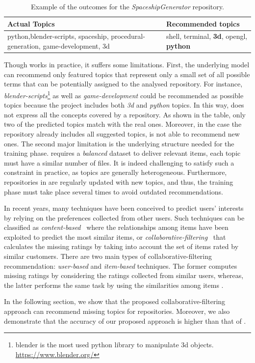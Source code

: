 \begin{table}[h]
\centering
\resizebox{8.5cm}{!} {
\footnotesize
\begin{tabular}{| p{3.2cm} | p{3.2cm} | }
\hline
 \textbf{Actual Topics} &\textbf{ Recommended topics} \\ \hline
     python,blender-scripts, spaceship, procedural-generation, 
     game-development, 3d        &  
  shell, terminal, \textbf{3d},    opengl,    \textbf{python}        \\ \hline

\end{tabular}
}
\caption{Example of the \MNB outcomes for the \emph{SpaceshipGenerator} repository.}
\label{tab:example}
\end{table} 


Though \MNB works in practice, it suffers some limitations. First, the 
underlying model can recommend only featured topics that represent only a small 
set of all possible terms that can be potentially assigned to the analysed 
repository.
%
For instance, \emph{blender-scripts}\footnote{blender is the most used python 
library to manipulate 3d objects. \url{https://www.blender.org/}} as well as 
\emph{game-development} could be recommended as possible topics because the 
project includes both \emph{3d} and \emph{python} topics.
In this way, \MNB does not express all the concepts covered by a \GH 
repository. As shown in the table, only two of the predicted topics match 
with the real ones. Moreover, in the case the repository already includes all 
suggested topics, \MNB is not able to recommend new ones.
The second major limitation is the underlying structure needed for the training 
phase. \MNB requires a \emph{balanced} dataset to deliver relevant items, 
\ie each topic must have a similar number of \RM files. It is indeed challenging to satisfy such a constraint in practice, as topics are generally heterogeneous. 
Furthermore, repositories in \GH are regularly updated with new topics, and 
thus, the training phase must take place several times to avoid outdated 
recommendations. 

In recent years, many techniques have been conceived to predict users' interests 
by relying on the preferences collected from other users. Such techniques can 
be classified as  \emph{content-based}~\cite{Pazzani2007} where the 
relationships among items have been exploited to predict the most similar items,
or \emph{collaborative-filtering}~\cite{Miranda:2008:ICF:1486927.1487083} that 
calculates the missing ratings by taking into account the set of items rated by 
similar customers. There are two main types of collaborative-filtering 
recommendation: \emph{user-based} \cite{Zhao:2010:UCR:1748610.1749278} and 
\emph{item-based} \cite{Sarwar:2001:ICF:371920.372071} techniques. The former 
computes missing ratings by considering the ratings collected from similar 
users, whereas, the latter performs the same task by using the similarities 
among items \cite{Cremonesi:2008:EMC:1468165.1468327}.

In the following section, we show that the proposed collaborative-filtering approach can recommend missing topics for \GH repositories. Moreover, we also demonstrate that the accuracy of 
our proposed approach is higher than that of \MNB.
